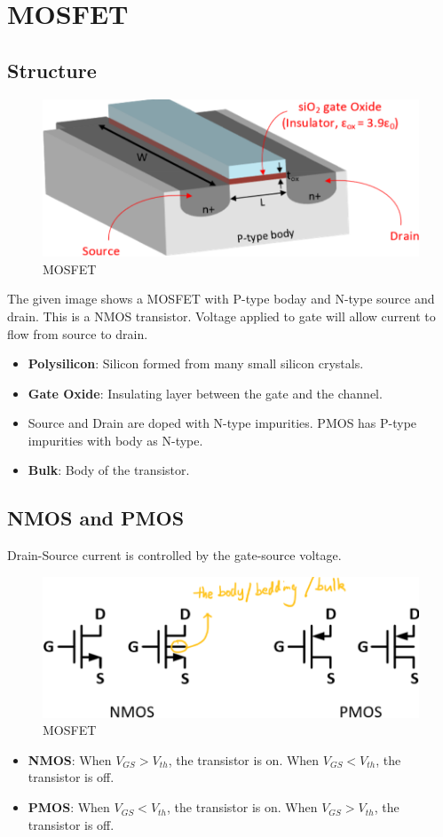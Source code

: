 \section{MOSFET}

\subsection{Structure}

\begin{figure}
    \centering
    \includegraphics[scale=0.5]{images/MOSFET.png}
    \caption{MOSFET}
\end{figure}

The given image shows a MOSFET with P-type boday and N-type source and drain. This is a NMOS transistor. Voltage applied to gate will allow current to flow from source to drain.

\begin{itemize}
    \item \textbf{Polysilicon}: Silicon formed from many small silicon crystals.
    \item \textbf{Gate Oxide}: Insulating layer between the gate and the channel.
    \item Source and Drain are doped with N-type impurities. PMOS has P-type impurities with body as N-type.
    \item \textbf{Bulk}: Body of the transistor.
\end{itemize}

\subsection{NMOS and PMOS}

Drain-Source current is controlled by the gate-source voltage.

\begin{figure}
    \centering
    \includegraphics[scale=0.5]{images/NMOSandPMOS.png}
    \caption{MOSFET}
\end{figure}

\begin{itemize}
    \item \textbf{NMOS}: When $V_{GS} > V_{th}$, the transistor is on. When $V_{GS} < V_{th}$, the transistor is off.
    \item \textbf{PMOS}: When $V_{GS} < V_{th}$, the transistor is on. When $V_{GS} > V_{th}$, the transistor is off.
\end{itemize}